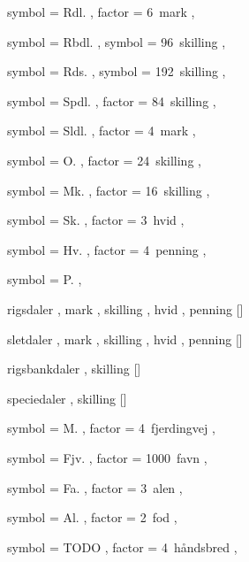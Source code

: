 
 {
	symbol = { Rdl. } ,
	factor = { 6~mark } ,
}

 {
	symbol = { Rbdl. } ,
	symbol = { 96~skilling } ,
}

 {
	symbol = { Rds. } ,
	symbol = { 192~skilling } ,
}

 {
	symbol = { Spdl. } ,
	factor = { 84~skilling } ,
}

 {
	symbol = { Sldl. } ,
	factor = { 4~mark } ,
}

 {
	symbol = { O. } ,
	factor = { 24~skilling } ,
}

 {
	symbol = { Mk. } ,
	factor = { 16~skilling } ,
}

 {
	symbol = { Sk. } ,
	factor = { 3~hvid } ,
}

 {
	symbol = { Hv. } ,
	factor = { 4~penning } ,
}

 {
	symbol = { P. } ,
}

 {
	rigsdaler ,
	mark ,
	skilling ,
	hvid ,
	penning
}[\rdl]

 {
	sletdaler ,
	mark ,
	skilling ,
	hvid ,
	penning
}[\sldl]

 {
	rigsbankdaler ,
	skilling
}[\rbdl]

 {
	speciedaler ,
	skilling
}[\spdl]



 {
	symbol = { M. } ,
	factor = { 4~fjerdingvej } ,
}

 {
	symbol = { Fjv. } ,
	factor = { 1000~favn } ,
}

 {
	symbol = { Fa. } ,
	factor = { 3~alen } ,
}

 {
	symbol = { Al. } ,
	factor = { 2~fod } ,
}

 {
	symbol = { TODO } ,
	factor = { 4~håndsbred } ,
}

